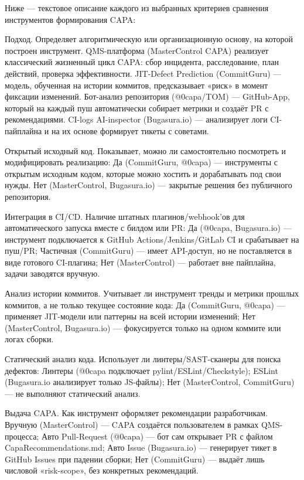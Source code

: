 Ниже — текстовое описание каждого из выбранных критериев сравнения инструментов формирования CAPA:


Подход. Определяет алгоритмическую или организационную основу, на которой построен инструмент. QMS-платформа (MasterControl CAPA) реализует классический жизненный цикл CAPA: сбор инцидента, расследование, план действий, проверка эффективности. JIT-Defect Prediction (CommitGuru) — модель, обученная на истории коммитов, предсказывает «риск» в момент фиксации изменений. Бот-анализ репозитория (@0capa/TOM) — GitHub-App, который на каждый пуш автоматически собирает метрики и создаёт PR с рекомендациями. CI-logs AI-inspector (Bugasura.io) — анализирует логи CI-пайплайна и на их основе формирует тикеты с советами.

Открытый исходный код. Показывает, можно ли самостоятельно посмотреть и модифицировать реализацию: Да (CommitGuru, @0capa) — инструменты с открытым исходным кодом, которые можно хостить и дорабатывать под свои нужды. Нет (MasterControl, Bugasura.io) — закрытые решения без публичного репозитория.

Интеграция в CI/CD. Наличие штатных плагинов/webhook’ов для автоматического запуска вместе с билдом или PR: Да (@0capa, Bugasura.io) — инструмент подключается к GitHub Actions/Jenkins/GitLab CI и срабатывает на пуш/PR; Частичная (CommitGuru) — имеет API-доступ, но не поставляется в виде готового CI-плагина; Нет (MasterControl) — работает вне пайплайна, задачи заводятся вручную.

Анализ истории коммитов. Учитывает ли инструмент тренды и метрики прошлых коммитов, а не только текущее состояние кода: Да (CommitGuru, @0capa) — применяет JIT-модели или паттерны на всей истории изменений; Нет (MasterControl, Bugasura.io) — фокусируется только на одном коммите или логах сборки.

Статический анализ кода. Использует ли линтеры/SAST-сканеры для поиска дефектов: Линтеры (@0capa подключает pylint/ESLint/Checkstyle); ESLint (Bugasura.io анализирует только JS-файлы); Нет (MasterControl, CommitGuru) — не выполняют статический анализ.

Выдача CAPA. Как инструмент оформляет рекомендации разработчикам. Вручную (MasterControl) — CAPA создаётся пользователем в рамках QMS-процесса; Авто Pull-Request (@0capa) — бот сам открывает PR с файлом CapaRecommendations.md; Авто Issue (Bugasura.io) — генерирует тикет в GitHub Issues при падении сборки; Нет (CommitGuru) — выдаёт лишь числовой «risk-scope», без конкретных рекомендаций.

